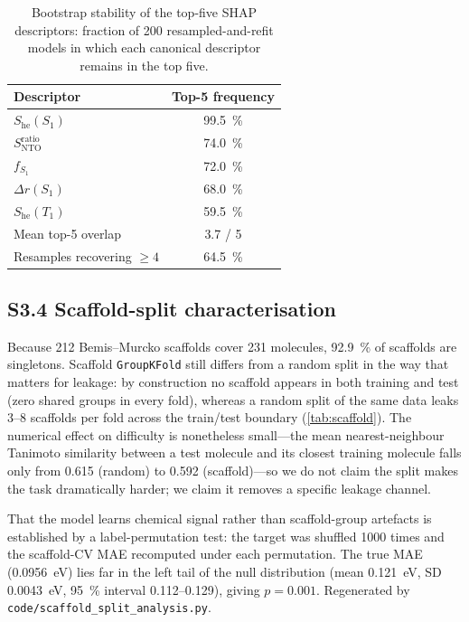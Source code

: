 \documentclass[final,3p,times,twocolumn]{elsarticle}
\begin{document}
\begin{table}[htbp]
  \centering
  \caption{Bootstrap stability of the top-five SHAP descriptors: fraction of
    \num{200} resampled-and-refit models in which each canonical descriptor remains
    in the top five.}
  \label{tab:shapboot}
  \begin{tabular}{lc}
    \toprule
    Descriptor & Top-5 frequency \\
    \midrule
    $S_\text{he}(S_1)$            & \qty{99.5}{\percent} \\
    $S_\text{NTO}^{\text{ratio}}$ & \qty{74.0}{\percent} \\
    $f_{S_1}$                     & \qty{72.0}{\percent} \\
    $\Delta r(S_1)$               & \qty{68.0}{\percent} \\
    $S_\text{he}(T_1)$            & \qty{59.5}{\percent} \\
    \midrule
    Mean top-5 overlap            & 3.7 / 5 \\
    Resamples recovering $\ge 4$  & \qty{64.5}{\percent} \\
    \bottomrule
  \end{tabular}
\end{table}

\subsection*{S3.4 Scaffold-split characterisation}
Because \num{212} Bemis--Murcko scaffolds cover \num{231} molecules,
\qty{92.9}{\percent} of scaffolds are singletons. Scaffold
\texttt{GroupKFold} still differs from a random split in
the way that matters for leakage: by construction no scaffold appears in both
training and test (zero shared groups in every fold), whereas a random split of the
same data leaks \numrange{3}{8} scaffolds per fold across the train/test boundary
(\cref{tab:scaffold}). The numerical effect on difficulty is nonetheless small---the
mean nearest-neighbour Tanimoto similarity between a test molecule and its closest
training molecule falls only from \num{0.615} (random) to \num{0.592} (scaffold)---so
we do not claim the split makes the task dramatically harder; we claim it removes a
specific leakage channel.

That the model learns chemical signal rather than scaffold-group artefacts is
established by a label-permutation test: the target was shuffled \num{1000} times and
the scaffold-CV MAE recomputed under each permutation. The true MAE
(\qty{0.0956}{\electronvolt}) lies far in the left tail of the null distribution
(mean \qty{0.121}{\electronvolt}, SD \qty{0.0043}{\electronvolt}, \qty{95}{\percent}
interval \numrange{0.112}{0.129}), giving $p = 0.001$. Regenerated by
\texttt{code/scaffold\_split\_analysis.py}.
\end{document}

